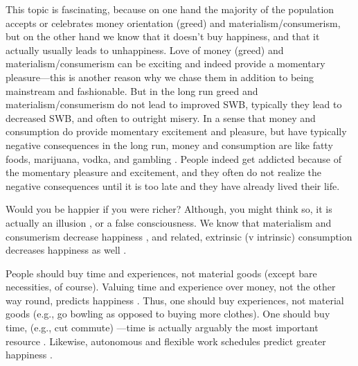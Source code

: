 \documentclass[10pt, letterpaper]{article}
\begin{document}
\begin{spacing}{1.8}
This topic is fascinating, because on one hand the majority of the population
accepts or celebrates money orientation (greed) and materialism/consumerism, but on the other hand
we know that it doesn't buy happiness, and that it actually usually leads to
unhappiness. Love of money (greed) and materialism/consumerism can be
exciting and indeed provide a momentary pleasure---this is another reason why we
chase them in addition to being mainstream and fashionable. 
But in the long run greed and materialism/consumerism do not lead to improved SWB, typically they lead to decreased SWB, and often to outright misery. In a
sense that money and consumption do provide momentary excitement and pleasure,
but have typically negative consequences in the long run, money and consumption
are like fatty foods, marijuana, vodka, and gambling \citep{linden11}. People
indeed get addicted because of the momentary pleasure and excitement, and they
often do not realize the negative consequences until it is too late and they
have already lived their life. 
%
%
%

Would you be happier if you were richer? Although, you might think so, it is
actually an illusion \citep{kahneman06c}, or a false consciousness. %
 We know that materialism and consumerism decrease happiness 
\citep{kasser16,dittmar14,brown05,kasser13,schmuck00,kasser93,leonard10}, and
related, extrinsic (v intrinsic) consumption decreases happiness as well
\citep{ryan00,ryan99,morrison17}.

People should buy time and experiences, not material goods (except bare necessities, of course). 
Valuing time and experience over money, not the other way round, predicts happiness \citep{whillans2019valuing}.
Thus, one should buy experiences, not material goods (e.g., go bowling as opposed to buying more clothes)\citep{putnam01,kasser16,dittmar14}. One should buy time, (e.g., cut commute)%
---time is actually arguably the most important resource \citep{masuda20,williams16,whillans17}. Likewise, autonomous and flexible work schedules predict greater happiness \citep{gssLonnie18,aokLead17,farber16sep15,golden06w,golden13}.%


\end{spacing}
\end{document}
